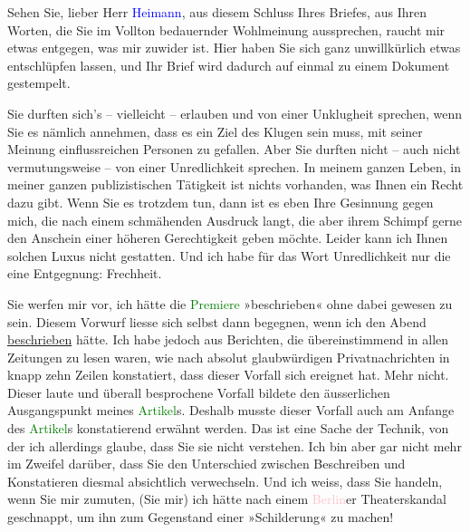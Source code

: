 \pstart
           Sehen Sie, lieber Herr \textcolor{blue}{Heimann}{}\ledrightnote{\textcolor{blue}{Moritz Heimann}}, aus diesem
               Schluss Ihres Briefes, aus Ihren Worten, die Sie im Vollton bedauernder Wohlmeinung
               aussprechen, raucht mir etwas entgegen, was mir zuwider ist. Hier haben Sie sich ganz unwillkürlich etwas
               entschlüpfen lassen, und Ihr Brief wird dadurch auf einmal zu einem Dokument
               gestempelt.\pend
           
\pstart
           Sie durften sich’s – vielleicht – erlauben und von einer Unklugheit sprechen, wenn
               Sie es nämlich annehmen, dass es ein Ziel des Klugen sein muss, mit seiner Meinung
               einflussreichen Personen zu gefallen. Aber Sie durften nicht – auch nicht
               vermutungsweise – von einer Unredlichkeit sprechen. In meinem ganzen Leben, in mei{\pb}ner ganzen publizistischen
               Tätigkeit ist nichts vorhanden, was Ihnen ein Recht dazu gibt. Wenn Sie es trotzdem
               tun, dann ist es eben Ihre Gesinnung gegen mich, die nach einem schmähenden Ausdruck
               langt, die aber ihrem Schimpf gerne den Anschein einer höheren Gerechtigkeit geben
               möchte. Leider kann ich Ihnen solchen Luxus nicht gestatten. Und ich habe für das
               Wort Unredlichkeit nur die eine Entgegnung: Frechheit.\pend
           
\pstart
           Sie werfen mir vor, ich hätte die \textcolor{green}{Premiere}{}\ledrightnote{{$\rightarrow$}\textcolor{green}{Die Jungfern vom Bischofsberg. Lustspiel}} »beschrieben« ohne dabei gewesen zu sein. Diesem Vorwurf liesse
               sich selbst dann begegnen, wenn ich den Abend \uline{beschrieben} hätte. Ich habe jedoch aus Berichten, die übereinstimmend in
               allen Zeitungen zu lesen waren, wie nach absolut glaubwürdigen Privatnachrichten in
               knapp zehn Zeilen konstatiert, dass dieser Vorfall sich ereignet hat. Mehr nicht.
               Dieser laute und überall besprochene Vorfall bildete den äusserlichen Ausgangspunkt
               meines \textcolor{green}{Artikel}{}\ledrightnote{{$\rightarrow$}\textcolor{green}{Der Fall Hauptmann}}s. Deshalb
               musste dieser Vorfall auch am Anfange des \textcolor{green}{Artikel}{}\ledrightnote{{$\rightarrow$}\textcolor{green}{Der Fall Hauptmann}}s konstatierend erwähnt werden. Das ist eine Sache
               der Technik, von der ich allerdings glaube, dass Sie sie nicht verstehen. Ich bin
               aber gar nicht mehr im Zweifel darüber, dass Sie den Unterschied zwischen Beschreiben
               und Konstatieren diesmal absichtlich verwechseln. Und ich weiss, dass Sie \label{K_L03438-11v}\label{K_L03438-11h}
               handeln, wenn Sie mir zumuten, (Sie mir) ich hätte nach einem \textcolor{pink}{Berlin}{}\ledrightnote{\textcolor{pink}{Berlin}}er Theaterskandal geschnappt, um ihn zum Gegenstand einer
               »Schilderung« zu machen!\pend
           
